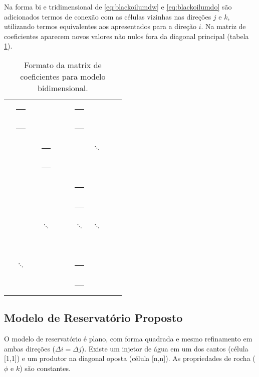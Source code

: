 \documentclass[final,5p]{elsarticle}
\numberwithin{equation}{section}
\newcommand*{\squareb}{\textcolor{black}{\rule{0.5em}{0.5em}}}
\newcommand*{\squareg}{\textcolor{gray}{\rule{0.5em}{0.5em}}}
\begin{document}
        Na forma bi e tridimensional de \ref{eq:blackoilumdw} e \ref{eq:blackoilumdo} são adicionados termos de conexão com as células vizinhas nas direções $j$ e $k$, utilizando termos equivalentes aos apresentados para a direção $i$. Na matriz de coeficientes aparecem novos valores não nulos fora da diagonal principal (tabela \ref{tab:bidimensional}).
        \begin{table}
            \centering
            \caption{Formato da matrix de coeficientes para modelo bidimensional.}
            \label{tab:bidimensional}
            \bigskip
            \renewcommand{\arraystretch}{0.8}
            \begin{tabularx}{0.35\textwidth}{|XXXXXXXXXX|}
                \squareb & \squareb & \squareg &          &          &          & \squareg &          &          &          \\
                \squareb & \squareb & \squareg &          &          &          & \squareg &          &          &          \\
                \squareg &          & \squareb & \squareb & \squareg &          &          & $\ddots$ &          &          \\
                \squareg &          & \squareb & \squareb & \squareg &          &          &          &          &          \\
                         &          & \squareg &          & \squareb & \squareb & \squareg &          &          &          \\
                         &          & \squareg &          & \squareb & \squareb & \squareg &          &          &          \\
                \squareg &          &          & $\ddots$ &          &          & $\ddots$ & $\ddots$ &          &          \\
                \squareg &          &          &          &          &          &          &          &          &          \\
                         & $\ddots$ &          &          &          &          & \squareg &          & \squareb & \squareb \\
                         &          &          &          &          &          & \squareg &          & \squareb & \squareb \\
            \end{tabularx}
        \end{table}

        \subsection{Modelo de Reservatório Proposto}
            O modelo de reservatório é plano, com forma quadrada e mesmo refinamento em ambas direções ($\Delta i = \Delta j$). Existe um injetor de água em um dos cantos (célula [1,1]) e um produtor na diagonal oposta (célula [n,n]). As propriedades de rocha ($\phi$ e $k$) são constantes.
\end{document}
